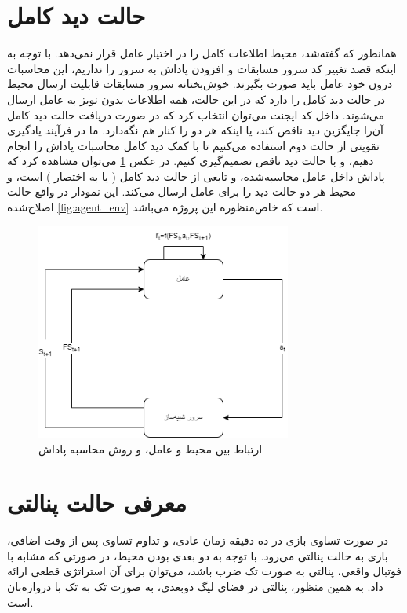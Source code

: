 \section{حالت دید کامل}
همانطور که گفته‌شد، محیط اطلاعات کامل را در اختیار عامل قرار نمی‌دهد. با توجه به اینکه قصد تغییر کد سرور مسابقات و افزودن پاداش به سرور را نداریم، این محاسبات درون خود عامل باید صورت بگیرند.
خوش‌بختانه سرور مسابقات قابلیت ارسال محیط در حالت دید کامل
 را دارد که در این حالت، همه اطلاعات بدون نویز به عامل ارسال می‌شوند.
 داخل کد ایجنت می‌توان انتخاب کرد که در صورت دریافت حالت دید کامل آن‌را جایگزین دید ناقص کند، یا اینکه هر دو را کنار هم نگه‌دارد.
 ما در فرآیند یادگیری تقویتی از حالت دوم استفاده می‌کنیم تا با کمک دید کامل محاسبات پاداش را انجام دهیم، و با حالت دید ناقص تصمیم‌گیری کنیم.
در عکس \ref{fig:ss2d_rl_loop} می‌توان مشاهده کرد که پاداش داخل عامل محاسبه‌شده، و تابعی از حالت دید کامل ( یا به اختصار )
است، و محیط هر دو حالت دید را برای عامل ارسال می‌کند.
این نمودار در واقع حالت اصلاح‌شده \ref{fig:agent_env} است که خاص‌منظوره این پروژه می‌باشد.
 \begin{figure}[H]
    \centering
    \includegraphics[width=0.75\textwidth]{images/ss2d_reward.png}
    \caption{ارتباط بین محیط و عامل، و روش محاسبه پاداش}\label{fig:ss2d_rl_loop}
 \end{figure}
\section{معرفی حالت پنالتی}
در صورت تساوی بازی در ده دقیقه زمان عادی، و تداوم تساوی پس از وقت اضافی، بازی به حالت پنالتی می‌رود. 
با توجه به دو بعدی بودن محیط، در صورتی که مشابه با فوتبال واقعی، پنالتی به صورت تک ضرب باشد، می‌توان برای آن استراتژی قطعی ارائه داد.
به همین منظور، پنالتی در فضای لیگ دو‌بعدی، به صورت تک به تک با دروازه‌بان است.

